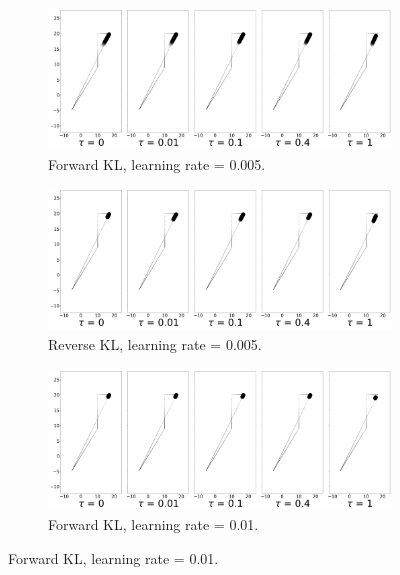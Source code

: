 \documentclass[twoside,11pt]{article}
\begin{document}


\begin{figure}[!htb]
  \centering
  \begin{subfigure}[b]{0.85\linewidth}
    \centering
    \includegraphics[width=0.8\columnwidth]{figs/switch-stay/notlearnQ/polytope_forward_optim=rmsprop_lr=[0.005].png}
    \caption{Forward KL, learning rate = 0.005.}
    \label{fig:discrete-switch-stay-forward-adam0.005}
  \end{subfigure}
  
  \begin{subfigure}[b]{0.85\linewidth}
        \centering
        \includegraphics[width=0.8\columnwidth]{figs/switch-stay/notlearnQ/polytope_reverse_optim=rmsprop_lr=[0.005].png}
        \caption{Reverse KL, learning rate = 0.005.}
        \label{fig:discrete-switch-stay-reverse-adam0.005}
  \end{subfigure}
  
  \begin{subfigure}[b]{0.85\linewidth}
    \centering
    \includegraphics[width=0.8\columnwidth]{figs/switch-stay/notlearnQ/polytope_forward_optim=rmsprop_lr=[0.01].png}
    \caption{Forward KL, learning rate = 0.01.}
    \label{fig:discrete-switch-stay-forward-adam0.01}
  \end{subfigure}
  

\end{figure}
\end{document}
